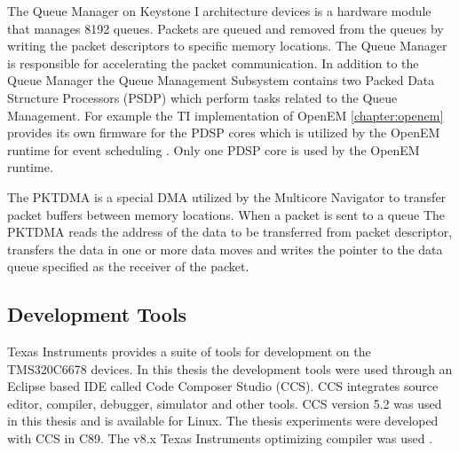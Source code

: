 The Queue Manager on Keystone I architecture devices is a hardware module that manages 8192 queues. Packets are queued and removed from the queues by writing the packet descriptors to specific memory locations. The Queue Manager is responsible for accelerating the packet communication. In addition to the Queue Manager the Queue Management Subsystem contains two Packed Data Structure Processors (PSDP) which perform tasks related to the Queue Management. \cite{navigator} For example the TI implementation of OpenEM \ref{chapter:openem} provides its own firmware for the PDSP cores which is utilized by the OpenEM runtime for event scheduling \cite{openemwhite}. Only one PDSP core is used by the OpenEM runtime.

The PKTDMA is a special DMA utilized by the Multicore Navigator to transfer packet buffers between memory locations. When a packet is sent to a queue The PKTDMA reads the address of the data to be transferred from packet descriptor, transfers the data in one or more data moves and writes the pointer to the data queue specified as the receiver of the packet. \cite{navigator} 

\subsection{Development Tools}
\label{subsec:devtools}

Texas Instruments provides a suite of tools for development on the TMS320C6678 devices. In this thesis the development tools were used through an Eclipse based IDE called Code Composer Studio (CCS). CCS integrates source editor, compiler, debugger, simulator and other tools. CCS version 5.2 was used in this thesis and is available for Linux. \cite{ccspage} The thesis experiments were developed with CCS in C89. The v8.x Texas Instruments optimizing compiler was used \cite{compilerguide}.
